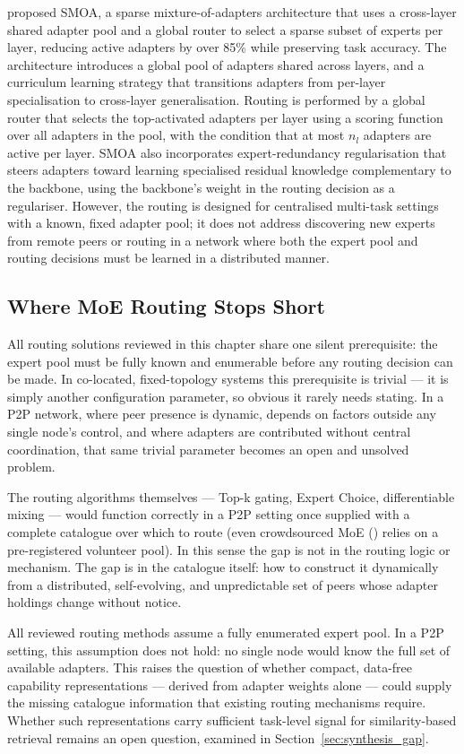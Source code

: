 \citet{LiZhouSparser2025} proposed SMOA, a sparse mixture-of-adapters architecture that
uses a cross-layer shared adapter pool and a global router to select a sparse subset of
experts per layer, reducing active adapters by over 85\% while preserving task accuracy.
The architecture introduces a global pool of adapters shared across layers, and a
curriculum learning strategy that transitions adapters from per-layer specialisation to
cross-layer generalisation. Routing is performed by a global router that selects the
top-activated adapters per layer using a scoring function over all adapters in the
pool, with the condition that at most $n_l$ adapters are active per layer. SMOA also
incorporates expert-redundancy regularisation that steers adapters toward learning
specialised residual knowledge complementary to the backbone, using the backbone's
weight in the routing decision as a regulariser. However, the routing is designed for
centralised multi-task settings with a known, fixed adapter pool; it does not address
discovering new experts from remote peers or routing in a network where both the expert
pool and routing decisions must be learned in a distributed manner.


\subsection{Where MoE Routing Stops Short}
\label{sec:moe_routing:implications}


All routing solutions reviewed in this chapter share one silent prerequisite: the expert pool must be fully known and enumerable before any routing decision can be made. In co-located, fixed-topology systems this prerequisite is trivial — it is simply another configuration parameter, so obvious it rarely needs stating. In a P2P network, where peer presence is dynamic, depends on factors outside any single node's control, and where adapters are contributed without central coordination, that same trivial parameter becomes an open and unsolved problem.

The routing algorithms themselves — Top-k gating, Expert Choice, differentiable mixing — would function correctly in a P2P setting once supplied with a complete catalogue over which to route (even crowdsourced MoE (\citet{RyabininCrowdsourced2020}) relies on a pre-registered volunteer pool). In this sense the gap is not in the routing logic or mechanism. The gap is in the catalogue itself: how to construct it dynamically from a distributed, self-evolving, and unpredictable set of peers whose adapter holdings change without notice.

All reviewed routing methods assume a fully enumerated expert pool. In a P2P setting, this assumption does not hold: no single node would know the full set of available adapters. This raises the question of whether compact, data-free capability representations — derived from adapter weights alone — could supply the missing catalogue information that existing routing mechanisms require. Whether such representations carry sufficient task-level signal for similarity-based retrieval remains an open question, examined in Section~\ref{sec:synthesis_gap}.

